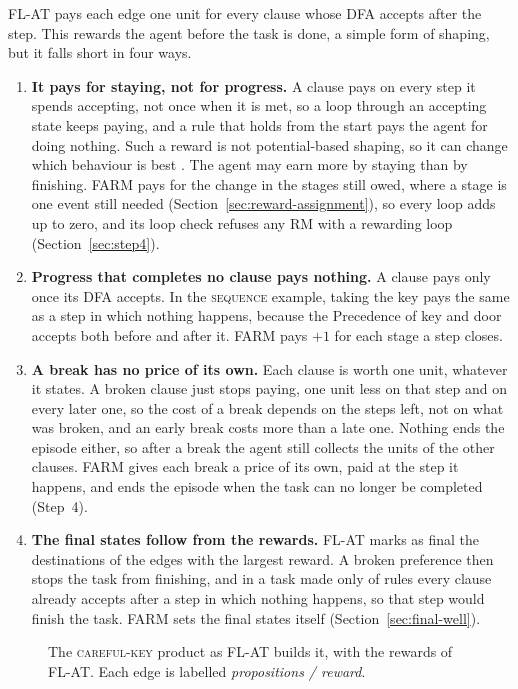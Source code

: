 \documentclass[11pt,english,listoffigures,listoftables]{tfgetsinf}
\newcommand{\runex}[1]{\textsc{#1}}  %
\begin{document}
FL-AT pays each edge one unit for every clause whose DFA accepts after the step. This rewards the agent before the task is done, a simple form of shaping, but it falls short in four ways.
\begin{enumerate}
    \item \textbf{It pays for staying, not for progress.} A clause pays on every step it spends accepting, not once when it is met, so a loop through an accepting state keeps paying, and a rule that holds from the start pays the agent for doing nothing. Such a reward is not potential-based shaping, so it can change which behaviour is best \cite{ng1999policy}. The agent may earn more by staying than by finishing. FARM pays for the change in the stages still owed, where a stage is one event still needed (Section~\ref{sec:reward-assignment}), so every loop adds up to zero, and its loop check refuses any RM with a rewarding loop (Section~\ref{sec:step4}).
    \item \textbf{Progress that completes no clause pays nothing.} A clause pays only once its DFA accepts. In the \runex{sequence} example, taking the key pays the same as a step in which nothing happens, because the Precedence of key and door accepts both before and after it. FARM pays $+1$ for each stage a step closes.
    \item \textbf{A break has no price of its own.} Each clause is worth one unit, whatever it states. A broken clause just stops paying, one unit less on that step and on every later one, so the cost of a break depends on the steps left, not on what was broken, and an early break costs more than a late one. Nothing ends the episode either, so after a break the agent still collects the units of the other clauses. FARM gives each break a price of its own, paid at the step it happens, and ends the episode when the task can no longer be completed (Step~4).
    \item \textbf{The final states follow from the rewards.} FL-AT marks as final the destinations of the edges with the largest reward. A broken preference then stops the task from finishing, and in a task made only of rules every clause already accepts after a step in which nothing happens, so that step would finish the task. FARM sets the final states itself (Section~\ref{sec:final-well}).
\end{enumerate}

\begin{figure}[H]
\centering
{}
\caption[Product of the \runex{careful key}]{The \runex{careful-key} product as FL-AT builds it, with the rewards of FL-AT. Each edge is labelled \textit{propositions / reward}.}
\label{fig:run-product3}
\end{figure}
\end{document}
